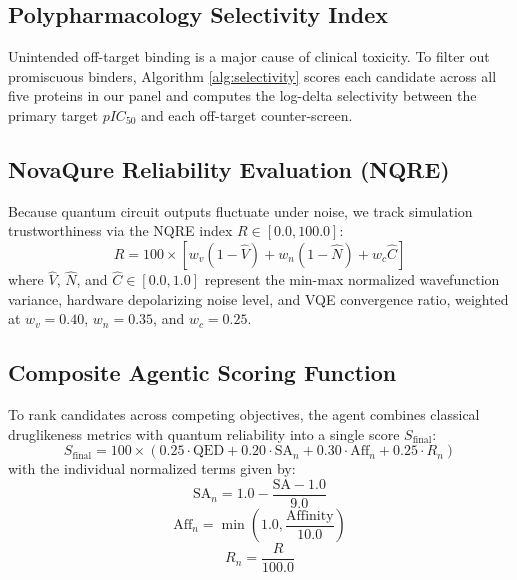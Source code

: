 \documentclass[journal,10pt,twocolumn]{IEEEtran}
\begin{document}
\subsection{Polypharmacology Selectivity Index}
Unintended off-target binding is a major cause of clinical toxicity. To filter out promiscuous binders, Algorithm \ref{alg:selectivity} scores each candidate across all five proteins in our panel and computes the log-delta selectivity between the primary target $pIC_{50}$ and each off-target counter-screen.

\subsection{NovaQure Reliability Evaluation (NQRE)}
Because quantum circuit outputs fluctuate under noise, we track simulation trustworthiness via the NQRE index $R \in [0.0, 100.0]$:
\begin{equation}
R = 100 \times [w_v(1-\hat{V}) + w_n(1-\hat{N}) + w_c\hat{C}]
\end{equation}
where $\hat{V}$, $\hat{N}$, and $\hat{C} \in [0.0, 1.0]$ represent the min-max normalized wavefunction variance, hardware depolarizing noise level, and VQE convergence ratio, weighted at $w_v = 0.40$, $w_n = 0.35$, and $w_c = 0.25$.

\subsection{Composite Agentic Scoring Function}
To rank candidates across competing objectives, the agent combines classical druglikeness metrics with quantum reliability into a single score $S_{\text{final}}$:
\begin{equation}
S_{\text{final}} = 100 \times (0.25 \cdot \text{QED} + 0.20 \cdot \text{SA}_{n} + 0.30 \cdot \text{Aff}_{n} + 0.25 \cdot R_{n})
\end{equation}
with the individual normalized terms given by:
\begin{equation}
\text{SA}_{n} = 1.0 - \frac{\text{SA} - 1.0}{9.0}
\end{equation}
\begin{equation}
\text{Aff}_{n} = \min \left(1.0, \frac{\text{Affinity}}{10.0} \right)
\end{equation}
\begin{equation}
R_{n} = \frac{R}{100.0}
\end{equation}
\end{document}
